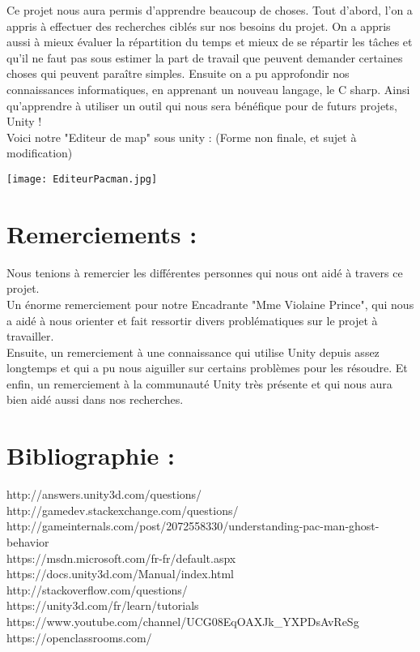 \documentclass[12pt,a4paper,article]{article} %
\begin{document}
Ce projet nous aura permis d'apprendre beaucoup de choses. Tout d'abord, l'on a appris à effectuer des recherches ciblés sur nos besoins du projet. On a appris aussi à mieux évaluer la répartition du temps et mieux de se répartir les tâches et qu'il ne faut pas sous estimer la part de travail que peuvent demander certaines choses qui peuvent paraître simples. Ensuite on a pu approfondir nos connaissances informatiques, en apprenant un nouveau langage, le C sharp. Ainsi qu'apprendre à utiliser un outil qui nous sera bénéfique pour de futurs projets, Unity !\\

Voici notre "Editeur de map" sous unity  : (Forme non finale, et sujet à modification)

\texttt{[image: EditeurPacman.jpg]}




\section{Remerciements :}

Nous tenions à remercier les différentes personnes qui nous ont aidé à travers ce projet.\\
Un énorme remerciement pour notre Encadrante "Mme Violaine Prince", qui nous a aidé à nous orienter et fait ressortir divers problématiques sur le projet à travailler.\\
Ensuite, un remerciement à une connaissance qui utilise Unity depuis assez longtemps et qui a pu nous aiguiller sur certains problèmes pour les résoudre.
Et enfin, un remerciement à la communauté Unity très présente et qui nous aura bien aidé aussi dans nos recherches.\\

















\section{Bibliographie :}
\noindent
http://answers.unity3d.com/questions/\\
http://gamedev.stackexchange.com/questions/\\
http://gameinternals.com/post/2072558330/understanding-pac-man-ghost-behavior\\
https://msdn.microsoft.com/fr-fr/default.aspx\\
https://docs.unity3d.com/Manual/index.html\\
http://stackoverflow.com/questions/\\
https://unity3d.com/fr/learn/tutorials\\
https://www.youtube.com/channel/UCG08EqOAXJk_YXPDsAvReSg\\
https://openclassrooms.com/\\
\end{document}
